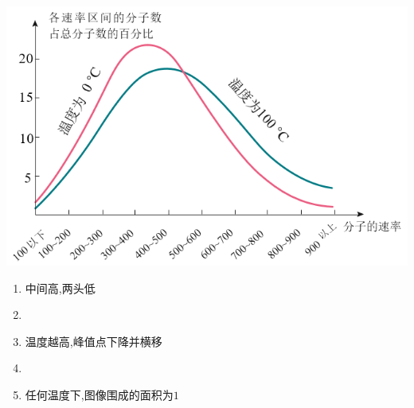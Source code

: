 \documentclass{article}
\begin{document}
\begin{itemize}
          \begin{minipage}{0.45\textwidth}
              \includegraphics[width=\textwidth,keepaspectratio]{./pictures/23.png}
          \end{minipage}
          \hfill
          \begin{minipage}{0.45\textwidth}
              \begin{enumerate}[label = (\arabic*)]
                  \item 中间高,两头低
                  \item[]
                  \item 温度越高,峰值点下降并横移
                  \item[]
                  \item 任何温度下,图像围成的面积为$1$
              \end{enumerate}
          \end{minipage}
\end{itemize}

\vspace{2em}
\end{document}
